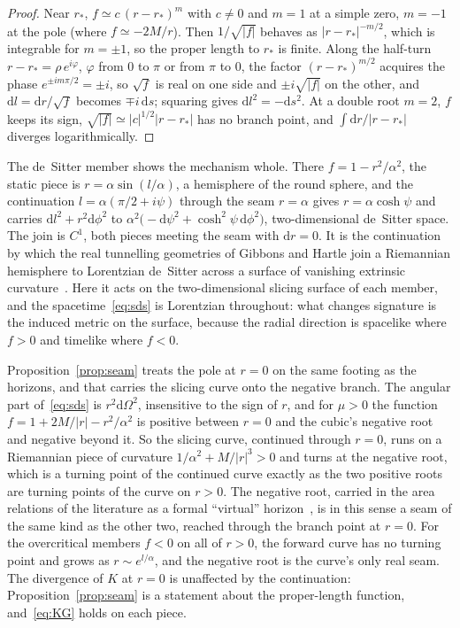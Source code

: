 \documentclass[11pt]{article}
\theoremstyle{plain}
\theoremstyle{definition}
\theoremstyle{remark}
\newcommand{\dd}{\mathrm{d}}
\begin{document}
\begin{proof}
Near $r_{*}$, $f\simeq c\,(r-r_{*})^{m}$ with $c\neq0$ and $m=1$ at a simple zero, $m=-1$ at the pole (where
$f\simeq-2M/r$). Then $1/\sqrt{|f|}$ behaves as $|r-r_{*}|^{-m/2}$, which is integrable for $m=\pm1$, so the proper
length to $r_{*}$ is finite. Along the half-turn $r-r_{*}=\rho\,e^{i\varphi}$, $\varphi$ from $0$ to $\pi$ or from
$\pi$ to $0$, the factor $(r-r_{*})^{m/2}$ acquires the phase $e^{\pm im\pi/2}=\pm i$, so $\sqrt{f}$ is real on one
side and $\pm i\sqrt{|f|}$ on the other, and $\dd l=\dd r/\sqrt f$ becomes $\mp i\,\dd s$; squaring gives
$\dd l^{2}=-\dd s^{2}$. At a double root $m=2$, $f$ keeps its sign, $\sqrt{|f|}\simeq|c|^{1/2}|r-r_{*}|$ has no
branch point, and $\int\dd r/|r-r_{*}|$ diverges logarithmically.
\end{proof}

The de~Sitter member shows the mechanism whole. There $f=1-r^{2}/\alpha^{2}$, the static piece is
$r=\alpha\sin(l/\alpha)$, a hemisphere of the round sphere, and the continuation $l=\alpha(\pi/2+i\psi)$ through the
seam $r=\alpha$ gives $r=\alpha\cosh\psi$ and carries $\dd l^{2}+r^{2}\dd\phi^{2}$ to
$\alpha^{2}\bigl(-\dd\psi^{2}+\cosh^{2}\!\psi\,\dd\phi^{2}\bigr)$, two-dimensional de~Sitter space. The join is $C^{1}$, both
pieces meeting the seam with $\dd r=0$. It is the continuation by which the real tunnelling geometries of
Gibbons and Hartle join a Riemannian hemisphere to Lorentzian de~Sitter across a surface of vanishing extrinsic
curvature~\cite{GibbonsHartle1990}. Here it acts on the two-dimensional slicing surface of each member, and the
spacetime~\eqref{eq:sds} is Lorentzian throughout: what changes signature is the induced metric on the surface,
because the radial direction is spacelike where $f>0$ and timelike where $f<0$.

Proposition~\ref{prop:seam} treats the pole at $r=0$ on the same footing as the horizons, and that carries the
slicing curve onto the negative branch. The angular part of~\eqref{eq:sds} is $r^{2}\dd\Omega^{2}$, insensitive to
the sign of $r$, and for $\mu>0$ the function $f=1+2M/|r|-r^{2}/\alpha^{2}$ is positive between $r=0$ and the
cubic's negative root and negative beyond it. So the slicing curve, continued through $r=0$, runs on a
Riemannian piece of curvature $1/\alpha^{2}+M/|r|^{3}>0$ and turns at the negative root, which is a turning point
of the continued curve exactly as the two positive roots are turning points of the curve on $r>0$. The negative
root, carried in the area relations of the literature as a formal ``virtual'' horizon~\cite{Visser2013}, is in
this sense a seam of the same kind as the other two, reached through the branch point at $r=0$. For the
overcritical members $f<0$ on all of $r>0$, the forward curve has no turning point and grows as
$r\sim e^{l/\alpha}$, and the negative root is the curve's only real seam. The divergence of $K$ at $r=0$ is
unaffected by the continuation: Proposition~\ref{prop:seam} is a statement about the proper-length function,
and~\eqref{eq:KG} holds on each piece.
\end{document}
